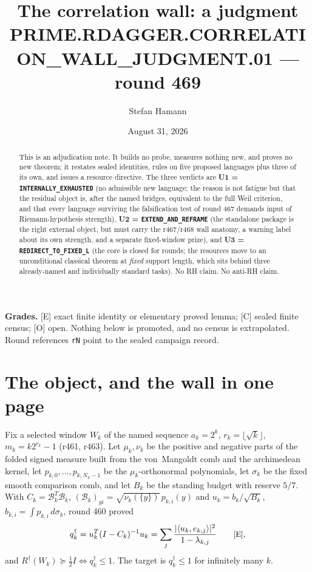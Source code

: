 \documentclass[11pt]{article}
\title{\bfseries The correlation wall: a judgment\\[2mm]
\large PRIME.RDAGGER.CORRELATION\_WALL\_JUDGMENT.01 --- round 469}
\author{Stefan Hamann}
\date{August 31, 2026}
\theoremstyle{remark}
\newcommand{\Rd}{R^{\dagger}}
\newcommand{\qdag}{q^{\dagger}}
\newcommand{\half}{\tfrac12}
\newcommand{\Egrade}{\textnormal{\small[E]}}
\newcommand{\Cgrade}{\textnormal{\small[C]}}
\newcommand{\Ograde}{\textnormal{\small[O]}}
\begin{document}
\maketitle

\begin{abstract}\noindent
This is an adjudication note.  It builds no probe, measures nothing
new, and proves no new theorem; it restates sealed identities, rules
on five proposed languages plus three of its own, and issues a
resource directive.  The three verdicts are
\textbf{U1 = \texttt{INTERNALLY\_EXHAUSTED}} (no admissible new
language; the reason is not fatigue but that the residual object is,
after the named bridges, equivalent to the full Weil criterion, and
that every language surviving the falsification test of round 467
demands input of Riemann-hypothesis strength),
\textbf{U2 = \texttt{EXTEND\_AND\_REFRAME}} (the standalone package
is the right external object, but must carry the r467/r468 wall
anatomy, a warning label about its own strength, and a separate
fixed-window prize), and
\textbf{U3 = \texttt{REDIRECT\_TO\_FIXED\_L}} (the core is closed for
rounds; the resources move to an unconditional classical theorem at
\emph{fixed} support length, which sits behind three already-named
and individually standard tasks).  No RH claim.  No anti-RH claim.
\end{abstract}

\medskip\noindent
\textbf{Grades.}\enspace
\Egrade{} exact finite identity or elementary proved lemma;
\Cgrade{} sealed finite census;
\Ograde{} open.  Nothing below is promoted, and no census is
extrapolated.  Round references \texttt{rN} point to the sealed
campaign record.

\section{The object, and the wall in one page}\label{sec:object}

Fix a selected window $W_k$ of the named sequence
$a_k=2^k$, $r_k=\lfloor\sqrt k\rfloor$, $m_k=k2^{r_k}-1$
(r461, r463).  Let $\mu_k,\nu_k$ be the positive and negative parts
of the folded signed measure built from the von~Mangoldt comb and the
archimedean kernel, let $p_{k,0},\dots,p_{k,N_k-1}$ be the
$\mu_k$-orthonormal polynomials, let $\sigma_k$ be the fixed smooth
comparison comb, and let $B_k$ be the standing budget with reserve
$5/7$.  With
$C_k=\mathcal B_k^{T}\mathcal B_k$,
$(\mathcal B_k)_{yi}=\sqrt{\nu_k(\{y\})}\,p_{k,i}(y)$ and
$u_k=b_k/\sqrt{B_k}$, $b_{k,i}=\int p_{k,i}\,d\sigma_k$, round 460
proved
\begin{equation}\label{eq:spectral}
 \qdag_k=u_k^{T}(I-C_k)^{-1}u_k
 =\sum_j\frac{|\langle u_k,e_{k,j}\rangle|^2}{1-\lambda_{k,j}}
 \qquad\Egrade,
\end{equation}
and $\Rd(W_k)\succeq\half I\iff\qdag_k\le1$.  The target is
$\qdag_k\le1$ for infinitely many $k$.
\end{document}
